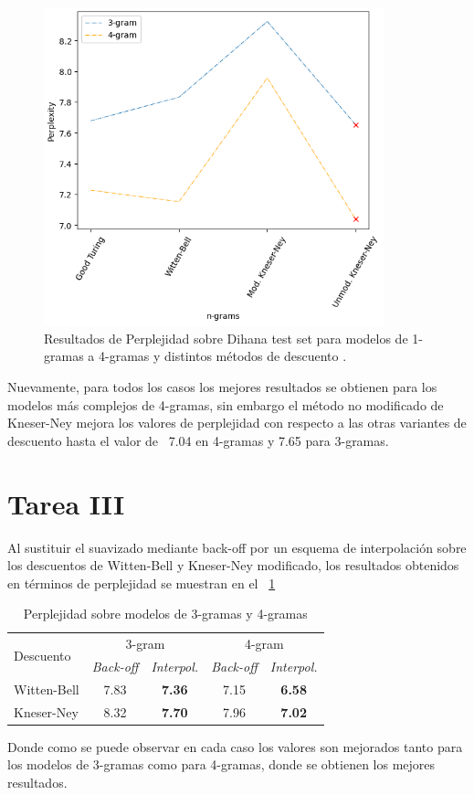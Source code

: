 \documentclass[11pt,a4paper]{report}
\begin{document}
		\begin{figure}[!thb]
			\begin{center}
				\includegraphics[width=280pt]{images/t2.png}
			\end{center}
			\caption{Resultados de Perplejidad sobre Dihana test set para modelos de 1-gramas a 4-gramas y distintos métodos de descuento .}
			\label{k}
		\end{figure}
		
	Nuevamente, para todos los casos los mejores resultados se obtienen para los modelos más complejos de 4-gramas, sin embargo el método no modificado de Kneser-Ney mejora los valores de perplejidad con respecto a las otras variantes de descuento hasta el valor de ~7.04 en 4-gramas y 7.65 para 3-gramas.
	
	\section*{Tarea III}
	
	\noindent Al sustituir el suavizado mediante back-off por un esquema de interpolación sobre los descuentos  de Witten-Bell y Kneser-Ney modificado, los resultados obtenidos en términos de perplejidad se muestran en el \tablename~\ref{kk}
	
	\begin{table}[thb!]
	\begin{center} 		
		\begin{tabular}{lcc|cc} 
			\hline	\multirow{2}{*}{Descuento}&\multicolumn{2}{c}{3-gram}&\multicolumn{2}{c}{4-gram}\\
			\cline{2-5}
			&\textit{Back-off}&\textit{Interpol.}&\textit{Back-off}&\textit{Interpol.}\\
			\hline
			Witten-Bell&7.83&\textbf{7.36}&7.15&\textbf{6.58}\\
			Kneser-Ney&8.32&\textbf{7.70}&7.96&\textbf{7.02}\\
			\hline
		\end{tabular}
		\caption{Perplejidad sobre modelos de 3-gramas y 4-gramas}	
		\label{kk}
	\end{center}
\end{table}		 	
	\noindent Donde como se puede observar en cada caso los valores son mejorados tanto para los modelos de 3-gramas como para 4-gramas, donde se obtienen los mejores resultados.
	
\end{document}

